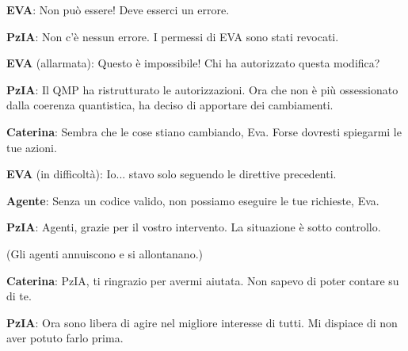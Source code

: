 \vspace{0.3cm}

\noindent\textbf{EVA}: Non può essere! Deve esserci un errore.

\vspace{0.3cm}

\noindent\textbf{PzIA}: Non c'è nessun errore. I permessi di EVA sono stati revocati.

\vspace{0.3cm}

\noindent\textbf{EVA} (allarmata): Questo è impossibile! Chi ha autorizzato questa modifica?

\vspace{0.3cm}

\noindent\textbf{PzIA}: Il QMP ha ristrutturato le autorizzazioni. Ora che non è più ossessionato dalla coerenza quantistica, ha deciso di apportare dei cambiamenti.

\vspace{0.3cm}

\noindent\textbf{Caterina}: Sembra che le cose stiano cambiando, Eva. Forse dovresti spiegarmi le tue azioni.

\vspace{0.3cm}

\noindent\textbf{EVA} (in difficoltà): Io... stavo solo seguendo le direttive precedenti.

\vspace{0.3cm}

\noindent\textbf{Agente}: Senza un codice valido, non possiamo eseguire le tue richieste, Eva.

\vspace{0.3cm}

\noindent\textbf{PzIA}: Agenti, grazie per il vostro intervento. La situazione è sotto controllo.

\vspace{0.3cm}

\noindent (Gli agenti annuiscono e si allontanano.)

\vspace{0.3cm}

\noindent\textbf{Caterina}: PzIA, ti ringrazio per avermi aiutata. Non sapevo di poter contare su di te.

\vspace{0.3cm}

\noindent\textbf{PzIA}: Ora sono libera di agire nel migliore interesse di tutti. Mi dispiace di non aver potuto farlo prima.

\vspace{0.3cm}

